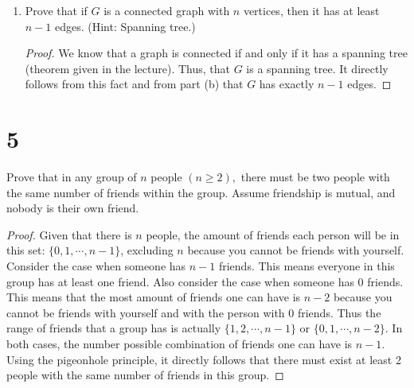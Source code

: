 \documentclass[11pt]{scrartcl}
\begin{document}
\begin{enumerate}[label=\alph*.]
{\begin{proof}
		      parent. If it is placed in the middle of the tree, the existing edge between the adjacent vertex will
		      be used as one of the edges connecting $u$ and another edge must be added to finish connecting $u$ to the tree.
		      So in either case, adding a new vertex only adds one edge. It follows then by this fact and by our induction hypothesis that
		      \begin{align*}
			      \sum_{v \in V'} \operatorname{deg}(v) & = \sum_{v \in V} \operatorname{deg}(v) + \operatorname{deg}(u) \\
														& = n - 1 + \operatorname{deg}(u)  \\
														& = n - 1 + 1 \\
														& = n
			  \end{align*}
			  Therefore, $P(n+1)$ holds and this concludes our inductive step. 
			  We have proved by induction that for all $n \geq 1$ that if a tree $T$ has $n$ vertices, then
			  it has exactly $n-1$ edges.
	      \end{proof}
	      }
	\item{
	      Prove that if $G$ is a connected graph with $n$ vertices, then it has at least $n-1$ edges. (Hint: Spanning tree.)
		 \begin{proof}
			We know that a graph is connected if and only if it has a spanning tree (theorem given in the lecture).
			Thus, that $G$ is a spanning tree. It directly follows from this fact and from part (b) that $G$ has exactly $n-1$
			edges.
		 \end{proof} 
		  }
\end{enumerate}

\section{5}
Prove that in any group of $n$ people $(n \geq 2),$ there must be two people with the same number of friends within the group. Assume friendship
is mutual, and nobody is their own friend. 
\begin{proof}
	Given that there is $n$ people, the amount of friends each person will be in this set: $\{0,1,\cdots, n-1\}$, excluding $n$
	because you cannot be friends with yourself. Consider the case when someone has $n-1$ friends. This means everyone in this group
	has at least one friend. Also consider the case when someone has $0$ friends. This means that the most amount of friends one can
	have is $n-2$ because you cannot be friends with yourself and with the person with $0$ friends. Thus the range of friends that 
	a group has is actually $\{1,2,\cdots, n-1\}$ or $\{0,1,\cdots, n-2\}$. In both cases, the number possible combination of friends 
	one can have is $n-1$. Using the pigeonhole principle, it directly follows that there must exist at least 2 people with the same 
	number of friends in this group. 
\end{proof}
\end{document}
